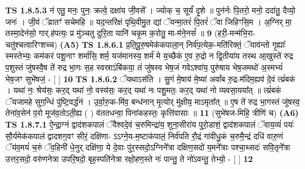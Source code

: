 \documentclass[17pt]{extarticle}
\begin{document}
                  \newline
                                \textbf{ TS 1.8.5.3} \newline
                  न॑ एतु॒ मनः॒ पुनः॒ क्रत्वे॒ दक्षा॑य जी॒वसे᳚ । ज्योक् च॒ सूर्यं॑ दृ॒शे ॥ पुन॑र्नः पि॒तरो॒ मनो॒ ददा॑तु॒ दैव्यो॒ जनः॑ । जी॒वं ॅव्रातꣳ॑ सचेमहि ॥ यद॒न्तरि॑क्षं पृथि॒वीमु॒त द्यां ॅयन्मा॒तरं॑ पि॒तरं॑ ॅवा जिहिꣳसि॒म । अ॒ग्निर् मा॒ तस्मा॒देन॑सो॒ गार्.ह॑पत्यः॒ प्र मु॑ञ्चतु दुरि॒ता यानि॑ चकृ॒म क॒रोतु॒ मा-म॑ने॒नसं᳚ ॥ \textbf{  9} \newline
                  \newline
                       (हरी॒-मन्म॑भि॒रा-चतु॑श्चत्वारिꣳशच्च)  \textbf{(A5)} \newline \newline
                                        \textbf{ TS 1.8.6.1} \newline
                  प्र॒ति॒पू॒रु॒षमेक॑कपाला॒न् निर्व॑प॒त्येक॒-मति॑रिक्तं॒ ॅयाव॑न्तो गृ॒ह्याः᳚ स्मस्तेभ्यः॒ कम॑करं पशू॒नाꣳ शर्मा॑सि॒ शर्म॒ यज॑मानस्य॒ शर्म॑ मे य॒च्छैक॑ ए॒व रु॒द्रो न द्वि॒तीया॑य तस्थ आ॒खुस्ते॑ रुद्र प॒शुस्तं जु॑षस्वै॒ष ते॑ रुद्र भा॒गः स॒ह स्वस्राऽंबि॑कया॒ तं जु॑षस्व भेष॒जं गवेऽश्वा॑य॒ पुरु॑षाय भेष॒जमथो॑ अ॒स्मभ्यं॑ भेष॒जꣳ सुभे॑षजं॒ - [ ] \textbf{  10} \newline
                  \newline
                                \textbf{ TS 1.8.6.2} \newline
                  ॅयथाऽस॑ति । सु॒गं मे॒षाय॑ मे॒ष्या॑ अवां᳚ब रु॒द्र-म॑दिम॒ह्यव॑ दे॒वं त्य्रं॑बकं । यथा॑ नः॒ श्रेय॑सः॒ कर॒द् यथा॑ नो॒ वस्य॑सः॒ कर॒द् यथा॑ नः पशु॒मतः॒ कर॒द् यथा॑ नो व्यवसा॒यया᳚त् ॥ त्य्रं॑बकं ॅयजामहे सुग॒न्धिं पु॑ष्टि॒वर्द्ध॑नं । उ॒र्वा॒रु॒क-मि॑व॒ बन्ध॑नान् मृ॒त्योर् मु॑क्षीय॒ माऽमृता᳚त् ॥ ए॒ष ते॑ रुद्र भा॒गस्तं जु॑षस्व॒ तेना॑व॒सेन॑ प॒रो मूज॑व॒तोऽती॒ह्य ( ) व॑ततधन्वा॒ पिना॑कहस्तः॒ कृत्ति॑वासाः ॥ \textbf{  11 } \newline
                  \newline
                      (सुभे॑षज-मिहि॒ त्रीणि॑ च)  \textbf{(A6)} \newline \newline
                                        \textbf{ TS 1.8.7.1} \newline
                  ऐ॒न्द्रा॒ग्नं द्वाद॑शकपालं ॅवैश्वदे॒वं च॒रुमिन्द्रा॑य॒ शुना॒सीरा॑य पुरो॒डाशं॒ द्वाद॑शकपालं ॅवाय॒व्यं॑ पयः॑ सौ॒र्यमेक॑कपालं द्वादशग॒वꣳ सीरं॒ दक्षि॑णा- ऽऽग्ने॒य-म॒ष्टाक॑पालं॒ निर्व॑पति रौ॒द्रं गा॑वीधु॒कं च॒रुमै॒न्द्रं दधि॑ वारु॒णं ॅय॑व॒मयं॑ च॒रुं ॅव॒हिनी॑ धे॒नुर् दक्षि॑णा॒ ये दे॒वाः पु॑र॒स्सदो॒ऽग्निने᳚त्रा दक्षिण॒सदो॑ य॒मने᳚त्राः पश्चा॒थ्सदः॑ सवि॒तृने᳚त्रा उत्तर॒सदो॒ वरु॑णनेत्रा उपरि॒षदो॒ बृह॒स्पति॑नेत्रा रक्षो॒हण॒स्ते नः॑ पान्तु॒ ते नो॑ऽवन्तु॒ तेभ्यो॒ - [ ] \textbf{  12} \newline
\end{document}
